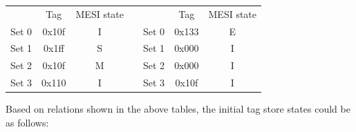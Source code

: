 \documentclass[12pt]{article}
\begin{document}
\begin{table}[H]
\begin{tabular}{ccclccc}
			\multicolumn{1}{|c|}{}      & \multicolumn{1}{c|}{Tag}                          & \multicolumn{1}{c|}{MESI state} & \multicolumn{1}{l|}{} & \multicolumn{1}{c|}{}      & \multicolumn{1}{c|}{Tag}                          & \multicolumn{1}{c|}{MESI state} \\ \cline{1-3} \cline{5-7} 
			\multicolumn{1}{|c|}{Set 0} & \multicolumn{1}{c|}{0x10f}                        & \multicolumn{1}{c|}{I}          & \multicolumn{1}{l|}{} & \multicolumn{1}{c|}{Set 0} & \multicolumn{1}{c|}{0x133}                        & \multicolumn{1}{c|}{E}          \\ \cline{1-3} \cline{5-7} 
			\multicolumn{1}{|c|}{Set 1} & \multicolumn{1}{c|}{{\color[HTML]{329A9D} 0x1ff}} & \multicolumn{1}{c|}{S}          & \multicolumn{1}{l|}{} & \multicolumn{1}{c|}{Set 1} & \multicolumn{1}{c|}{0x000}                        & \multicolumn{1}{c|}{I}          \\ \cline{1-3} \cline{5-7} 
			\multicolumn{1}{|c|}{Set 2} & \multicolumn{1}{c|}{0x10f}                        & \multicolumn{1}{c|}{M}          & \multicolumn{1}{l|}{} & \multicolumn{1}{c|}{Set 2} & \multicolumn{1}{c|}{0x000}                        & \multicolumn{1}{c|}{I}          \\ \cline{1-3} \cline{5-7} 
			\multicolumn{1}{|c|}{Set 3} & \multicolumn{1}{c|}{{\color[HTML]{D729BE} 0x110}} & \multicolumn{1}{c|}{I}          & \multicolumn{1}{l|}{} & \multicolumn{1}{c|}{Set 3} & \multicolumn{1}{c|}{0x10f}                        & \multicolumn{1}{c|}{I}          \\ \cline{1-3} \cline{5-7} 
		\end{tabular}
	\end{table}

Based on relations shown in the above tables, the initial tag store states could be as follows:
\end{document}
